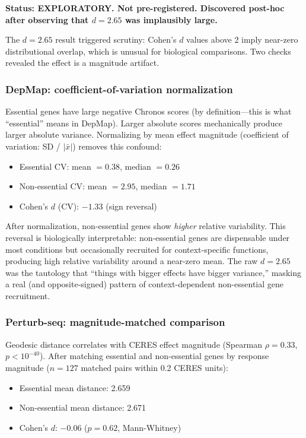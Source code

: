 \documentclass[11pt]{article}
\begin{document}
\textbf{Status: EXPLORATORY. Not pre-registered. Discovered post-hoc
after observing that $d = 2.65$ was implausibly large.}

The $d = 2.65$ result triggered scrutiny: Cohen's $d$ values above 2
imply near-zero distributional overlap, which is unusual for biological
comparisons. Two checks revealed the effect is a magnitude artifact.

\subsubsection{DepMap: coefficient-of-variation normalization}

Essential genes have large negative Chronos scores (by definition---this
is what ``essential'' means in DepMap). Larger absolute scores
mechanically produce larger absolute variance. Normalizing by mean
effect magnitude (coefficient of variation: SD / $|\bar{x}|$) removes
this confound:

\begin{itemize}
  \item Essential CV: mean $= 0.38$, median $= 0.26$
  \item Non-essential CV: mean $= 2.95$, median $= 1.71$
  \item Cohen's $d$ (CV): $-1.33$ (sign reversal)
\end{itemize}

After normalization, non-essential genes show \emph{higher} relative
variability. This reversal is biologically interpretable: non-essential
genes are dispensable under most conditions but occasionally recruited
for context-specific functions, producing high relative variability
around a near-zero mean. The raw $d = 2.65$ was the tautology that
``things with bigger effects have bigger variance,'' masking a real (and
opposite-signed) pattern of context-dependent non-essential gene
recruitment.

\subsubsection{Perturb-seq: magnitude-matched comparison}

Geodesic distance correlates with CERES effect magnitude (Spearman $\rho
= 0.33$, $p < 10^{-40}$). After matching essential and non-essential
genes by response magnitude ($n = 127$ matched pairs within 0.2 CERES
units):

\begin{itemize}
  \item Essential mean distance: 2.659
  \item Non-essential mean distance: 2.671
  \item Cohen's $d$: $-0.06$ ($p = 0.62$, Mann-Whitney)
\end{itemize}
\end{document}
